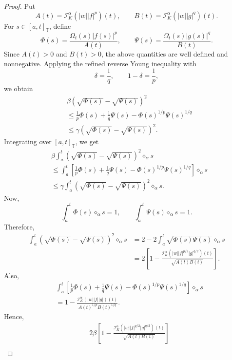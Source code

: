 \documentclass[11pt]{article}
\begin{document}
\begin{proof}
Put
\[
    A(t)=\mathcal{I}_{K}^{\alpha}(|w||f|^p)(t),
    \qquad
    B(t)=\mathcal{I}_{K}^{\alpha}(|w||g|^q)(t).
\]
For $s\in[a,t]_{\mathbb{T}}$, define
\[
    \Phi(s)=\frac{\Omega_t(s)|f(s)|^p}{A(t)},
    \qquad
    \Psi(s)=\frac{\Omega_t(s)|g(s)|^q}{B(t)}.
\]
Since $A(t)>0$ and $B(t)>0$, the above quantities are well defined and
nonnegative. Applying the refined reverse Young inequality with
\[
    \delta=\frac1q,
    \qquad
    1-\delta=\frac1p,
\]
we obtain
\[
\begin{aligned}
&\beta\left(\sqrt{\Phi(s)}-\sqrt{\Psi(s)}\right)^2     \\
&\leq
\frac1p\Phi(s)+\frac1q\Psi(s)
-\Phi(s)^{1/p}\Psi(s)^{1/q}                            \\
&\leq
\gamma\left(\sqrt{\Phi(s)}-\sqrt{\Psi(s)}\right)^2 .
\end{aligned}
\]
Integrating over $[a,t]_{\mathbb{T}}$, we get
\[
\begin{aligned}
&\beta\int_a^t
\left(\sqrt{\Phi(s)}-\sqrt{\Psi(s)}\right)^2
\diamond_{\alpha}s                                      \\
&\leq
\int_a^t
\left[
\frac1p\Phi(s)+\frac1q\Psi(s)
-\Phi(s)^{1/p}\Psi(s)^{1/q}
\right]\diamond_{\alpha}s                               \\
&\leq
\gamma\int_a^t
\left(\sqrt{\Phi(s)}-\sqrt{\Psi(s)}\right)^2
\diamond_{\alpha}s .
\end{aligned}
\]
Now,
\[
    \int_a^t \Phi(s)\diamond_{\alpha}s=1,
    \qquad
    \int_a^t \Psi(s)\diamond_{\alpha}s=1.
\]
Therefore,
\[
\begin{aligned}
\int_a^t
\left(\sqrt{\Phi(s)}-\sqrt{\Psi(s)}\right)^2
\diamond_{\alpha}s
&=
2-2\int_a^t\sqrt{\Phi(s)\Psi(s)}\diamond_{\alpha}s       \\
&=
2\left[
1-
\frac{
\mathcal{I}_{K}^{\alpha}
\left(|w||f|^{p/2}|g|^{q/2}\right)(t)
}
{\sqrt{A(t)B(t)}}
\right].
\end{aligned}
\]
Also,
\[
\begin{aligned}
&\int_a^t
\left[
\frac1p\Phi(s)+\frac1q\Psi(s)
-\Phi(s)^{1/p}\Psi(s)^{1/q}
\right]\diamond_{\alpha}s                                \\
&=
1-
\frac{
\mathcal{I}_{K}^{\alpha}(|w||f||g|)(t)
}
{
A(t)^{1/p}B(t)^{1/q}
}.
\end{aligned}
\]
Hence,
\[
\begin{aligned}
&2\beta
\left[
1-
\frac{
\mathcal{I}_{K}^{\alpha}
\left(|w||f|^{p/2}|g|^{q/2}\right)(t)
}
{\sqrt{A(t)B(t)}}
\right]                                                   \\

\end{aligned}\]
\end{proof}
\end{document}
